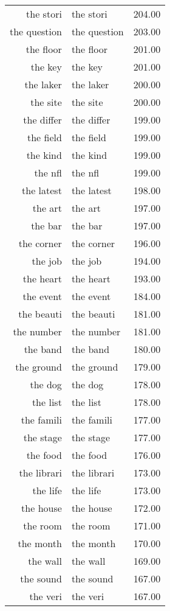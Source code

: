 \begin{table}[ht]
\begin{tabular}{rlr}
  the stori & the stori & 204.00 \\ 
  the question & the question & 203.00 \\ 
  the floor & the floor & 201.00 \\ 
  the key & the key & 201.00 \\ 
  the laker & the laker & 200.00 \\ 
  the site & the site & 200.00 \\ 
  the differ & the differ & 199.00 \\ 
  the field & the field & 199.00 \\ 
  the kind & the kind & 199.00 \\ 
  the nfl & the nfl & 199.00 \\ 
  the latest & the latest & 198.00 \\ 
  the art & the art & 197.00 \\ 
  the bar & the bar & 197.00 \\ 
  the corner & the corner & 196.00 \\ 
  the job & the job & 194.00 \\ 
  the heart & the heart & 193.00 \\ 
  the event & the event & 184.00 \\ 
  the beauti & the beauti & 181.00 \\ 
  the number & the number & 181.00 \\ 
  the band & the band & 180.00 \\ 
  the ground & the ground & 179.00 \\ 
  the dog & the dog & 178.00 \\ 
  the list & the list & 178.00 \\ 
  the famili & the famili & 177.00 \\ 
  the stage & the stage & 177.00 \\ 
  the food & the food & 176.00 \\ 
  the librari & the librari & 173.00 \\ 
  the life & the life & 173.00 \\ 
  the house & the house & 172.00 \\ 
  the room & the room & 171.00 \\ 
  the month & the month & 170.00 \\ 
  the wall & the wall & 169.00 \\ 
  the sound & the sound & 167.00 \\ 
  the veri & the veri & 167.00 \\ 

\end{tabular}
\end{table}
